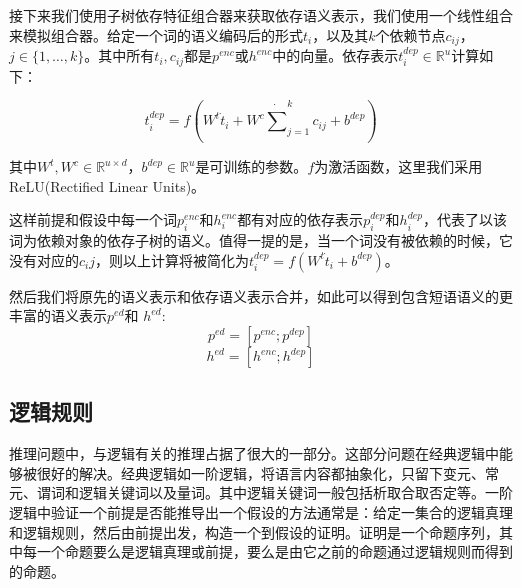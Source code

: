\documentclass[UTF8,11pt,a4paper,nofonts]{ctexart}
\begin{document}


接下来我们使用子树依存特征组合器来获取依存语义表示，我们使用一个线性组合来模拟组合器。给定一个词的语义编码后的形式$t_{i}$，以及其$k$个依赖节点$c_{ij}$，$j \in \{1,\dots,k\}$。其中所有$t_{i}, c_{ij}$都是$p^{enc}$或$h^{enc}$中的向量。依存表示$t^{dep}_i \in \mathbb{R}^u$计算如下：

\begin{equation}
t^{dep}_i = f(W^t \dot t_i + W^c \dot \sum^{k}_{j=1}c_{ij} + b^{dep})
\end{equation}

其中$W^t, W^c \in \mathbb{R}^{u \times d}$，$b^{dep} \in \mathbb{R}^{u}$是可训练的参数。$f$为激活函数，这里我们采用ReLU(Rectified Linear Units)。

这样前提和假设中每一个词$p^{enc}_i$和$h^{enc}_i$都有对应的依存表示$p^{dep}_i$和$h^{dep}_i$，代表了以该词为依赖对象的依存子树的语义。值得一提的是，当一个词没有被依赖的时候，它没有对应的$c_ij$，则以上计算将被简化为$t^{dep}_i = f(W^t \dot t_i + b^{dep})$。

然后我们将原先的语义表示和依存语义表示合并，如此可以得到包含短语语义的更丰富的语义表示$p^{ed}$和 $h^{ed}$:
\begin{equation}
p^{ed} = [p^{enc}; p^{dep}]
\end{equation}
\begin{equation}
h^{ed} = [h^{enc}; h^{dep}]
\end{equation}


\subsection{逻辑规则}


推理问题中，与逻辑有关的推理占据了很大的一部分。这部分问题在经典逻辑中能够被很好的解决。经典逻辑如一阶逻辑，将语言内容都抽象化，只留下变元、常元、谓词和逻辑关键词以及量词。其中逻辑关键词一般包括析取合取否定等。一阶逻辑中验证一个前提是否能推导出一个假设的方法通常是：给定一集合的逻辑真理和逻辑规则，然后由前提出发，构造一个到假设的证明。证明是一个命题序列，其中每一个命题要么是逻辑真理或前提，要么是由它之前的命题通过逻辑规则而得到的命题。
\end{document}
